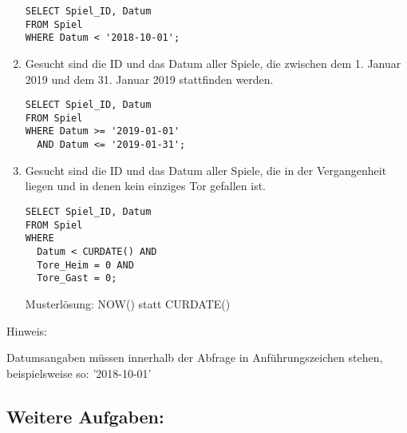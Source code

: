\documentclass{lehramt-informatik}
\begin{document}
\begin{enumerate}
\begin{verbatim}
SELECT Spiel_ID, Datum
FROM Spiel
WHERE Datum < '2018-10-01';
\end{verbatim}

%

\item Gesucht sind die ID und das Datum aller Spiele, die zwischen
dem 1. Januar 2019 und dem 31. Januar 2019 stattfinden werden.

\begin{verbatim}
SELECT Spiel_ID, Datum
FROM Spiel
WHERE Datum >= '2019-01-01'
  AND Datum <= '2019-01-31';
\end{verbatim}

%

\item Gesucht sind die ID und das Datum aller Spiele, die in der
Vergangenheit liegen und in denen kein einziges Tor gefallen ist.

\begin{verbatim}
SELECT Spiel_ID, Datum
FROM Spiel
WHERE
  Datum < CURDATE() AND
  Tore_Heim = 0 AND
  Tore_Gast = 0;
\end{verbatim}

Musterlösung: NOW() statt CURDATE()

\end{enumerate}

Hinweis:

Datumsangaben müssen innerhalb der Abfrage in Anführungszeichen stehen,
beispielsweise so: '2018-10-01'

%

\subsection{Weitere Aufgaben:}
\end{document}
